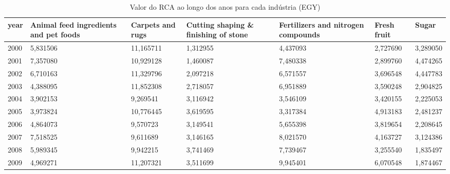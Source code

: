 \begin{table}
\centering
\caption{Valor do RCA ao longo dos anos para cada indústria (EGY)}
\begin{tabular}{p{1cm}p{2cm}p{2cm}p{2cm}p{2cm}p{2cm}p{2cm}}
\toprule
 year &  Animal feed ingredients and pet foods &  Carpets and rugs &  Cutting shaping \& finishing of stone &  Fertilizers and nitrogen compounds &  Fresh fruit &    Sugar \\
\midrule
 2000 &                               5,831506 &         11,165711 &                              1,312955 &                            4,437093 &     2,727690 & 3,289050 \\
 2001 &                               7,357080 &         10,929128 &                              1,460087 &                            7,480338 &     2,899760 & 4,474265 \\
 2002 &                               6,710163 &         11,329796 &                              2,097218 &                            6,571557 &     3,696548 & 4,447783 \\
 2003 &                               4,388095 &         11,852308 &                              2,718057 &                            6,951889 &     3,590248 & 2,904825 \\
 2004 &                               3,902153 &          9,269541 &                              3,116942 &                            3,546109 &     3,420155 & 2,225053 \\
 2005 &                               3,973824 &         10,776445 &                              3,619595 &                            3,317384 &     4,913183 & 2,481237 \\
 2006 &                               4,864073 &          9,570723 &                              3,149541 &                            5,655398 &     3,819654 & 2,208645 \\
 2007 &                               7,518525 &          9,611689 &                              3,146165 &                            8,021570 &     4,163727 & 3,124386 \\
 2008 &                               5,989345 &          9,942215 &                              3,741469 &                            7,739467 &     3,255540 & 1,835497 \\
 2009 &                               4,969271 &         11,207321 &                              3,511699 &                            9,945401 &     6,070548 & 1,874467 \\

\end{tabular}
\end{table}
